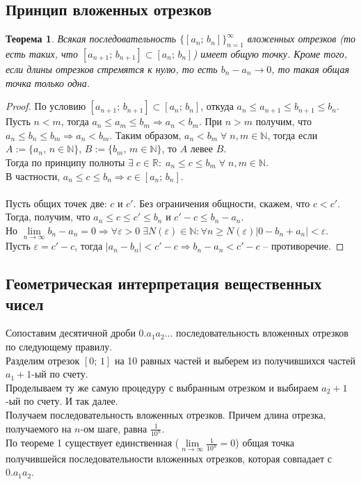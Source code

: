 \documentclass[12pt]{article}
\newtheorem{theorem}{Теорема}
\begin{document}
\subsection*{Принцип вложенных отрезков}
\begin{theorem}
Всякая последовательность $\{[a_n;\, b_n]\}_{n = 1}^\infty$ вложенных отрезков (то есть таких, что $[a_{n + 1};\, b_{n + 1}] \subset [a_n;\, b_n]$) имеет общую точку. Кроме того, если длины отрезков стремятся к нулю, то есть $b_n - a_n \to 0$, то такая общая точка только одна.
\end{theorem}
\begin{proof}
По условию $[a_{n + 1};\, b_{n + 1}] \subset [a_n;\, b_n]$, откуда $a_n \le a_{n + 1} \le b_{n + 1} \le b_n$.\\
Пусть $n < m$, тогда $a_n \le a_m \le b_m \Rightarrow a_n < b_m$. При $n > m$ получим, что $a_n \le b_n \le b_m \Rightarrow a_n < b_m$. Таким образом, $a_n < b_m\;\forall\;n,m\in\mathbb{N}$, тогда если $A:=\{a_n,\,n\in\mathbb{N}\},\,B:=\{b_m,\,m\in\mathbb{N}\}$, то $A$ левее $B$.\\
Тогда по принципу полноты $\exists\;c\in\mathbb{R}:\; a_n \le c \le b_m\;\forall\;n, m\in\mathbb{N}$.\\
В частности, $a_n \le c \le  b_n \Rightarrow c\in[a_n;\, b_n]$.\\
\\
Пусть общих точек две: $c$ и $c'$. Без ограничения общности, скажем, что $c < c'$. \\
Тогда, получим, что $a_n \le c \le c' \le b_n$ и $c' - c \le b_n - a_n$. \\
Но $\lim\limits_{n\to\infty} b_n - a_n = 0 \Rightarrow \forall\varepsilon>0\;\exists N(\varepsilon)\in\mathbb{N}:\forall n\ge N(\varepsilon) \left|0 - b_n + a_n\right| < \varepsilon$. \\
Пусть $\varepsilon = c' - c$, тогда $\left|a_n - b_n\right| < c' - c \Rightarrow b_n - a_n < c' - c$ -- противоречие. 
\end{proof}
\subsection*{Геометрическая интерпретация вещественных чисел}
Сопоставим десятичной дроби $0.a_1a_2...$ последовательность вложенных отрезков по следующему правилу. \\
Разделим отрезок $[0;\, 1]$ на 10 равных частей и выберем из получившихся частей $a_1+1$-ый по счету.\\
Проделываем ту же самую процедуру с выбранным отрезком и выбираем $a_2+1$-ый по счету. И так далее.\\
Получаем последовательность вложенных отрезков. Причем длина отрезка, получаемого на $n$-ом шаге, равна $\frac{1}{10^n}$. \\
По теореме 1 существует единственная ($\lim\limits_{n\to\infty} \frac{1}{10^n} = 0$) общая точка получившейся последовательности вложенных отрезков, которая совпадает с $0.a_1a_2$.
\end{document}
